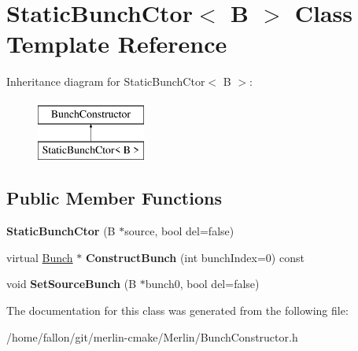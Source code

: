 \hypertarget{classStaticBunchCtor}{}\section{Static\+Bunch\+Ctor$<$ B $>$ Class Template Reference}
\label{classStaticBunchCtor}
Inheritance diagram for Static\+Bunch\+Ctor$<$ B $>$\+:\begin{figure}[H]
\begin{center}
\leavevmode
\includegraphics[height=2.000000cm]{classStaticBunchCtor}
\end{center}
\end{figure}
\subsection*{Public Member Functions}
\begin{DoxyCompactItemize}
\item 
\mbox{\label{classStaticBunchCtor_ad0737c8e8d94e6e29eee2350cf13018a}} 
{\bfseries Static\+Bunch\+Ctor} (B $\ast$source, bool del=false)
\item 
\mbox{\label{classStaticBunchCtor_a061a1709a4d2c94173f0f76ac5ebbd17}} 
virtual \hyperlink{classBunch}{Bunch} $\ast$ {\bfseries Construct\+Bunch} (int bunch\+Index=0) const
\item 
\mbox{\label{classStaticBunchCtor_ac4db62d8cb031f01ce6080c708fe7002}} 
void {\bfseries Set\+Source\+Bunch} (B $\ast$bunch0, bool del=false)
\end{DoxyCompactItemize}


The documentation for this class was generated from the following file\+:\begin{DoxyCompactItemize}
\item 
/home/fallon/git/merlin-\/cmake/\+Merlin/Bunch\+Constructor.\+h\end{DoxyCompactItemize}
